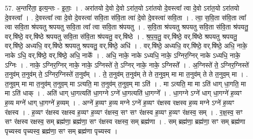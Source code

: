 \documentclass[17pt]{extarticle}
\begin{document}
57. अ॒न्तरि॑ता॒ इत्य॒न्तः - इ॒ताः॒ । . अरा॑तयो दे॒वो दे॒वो ऽरा॑त॒यो ऽरा॑तयो दे॒वस्त्वा᳚ त्वा दे॒वो ऽरा॑त॒यो ऽरा॑तयो दे॒वस्त्वा᳚ । . दे॒वस्त्वा᳚ त्वा दे॒वो दे॒वस्त्वा॑ सवि॒ता स॑वि॒ता त्वा॑ दे॒वो दे॒वस्त्वा॑ सवि॒ता । . त्वा॒ स॒वि॒ता स॑वि॒ता त्वा᳚ त्वा सवि॒ता श्र॑पयतु श्रपयतु सवि॒ता त्वा᳚ त्वा सवि॒ता श्र॑पयतु । . स॒वि॒ता श्र॑पयतु श्रपयतु सवि॒ता स॑वि॒ता श्र॑पयतु॒ वर्.षि॑ष्ठे॒ वर्.षि॑ष्ठे श्रपयतु सवि॒ता स॑वि॒ता श्र॑पयतु॒ वर्.षि॑ष्ठे । . श्र॒प॒य॒तु॒ वर्.षि॑ष्ठे॒ वर्.षि॑ष्ठे श्रपयतु श्रपयतु॒ वर्.षि॑ष्ठे॒ अध्यधि॒ वर्.षि॑ष्ठे श्रपयतु श्रपयतु॒ वर्.षि॑ष्ठे॒ अधि॑ । . वर्.षि॑ष्ठे॒ अध्यधि॒ वर्.षि॑ष्ठे॒ वर्.षि॑ष्ठे॒ अधि॒ नाके॒ नाके ऽधि॒ वर्.षि॑ष्ठे॒ वर्.षि॑ष्ठे॒ अधि॒ नाके᳚ । . अधि॒ नाके॒ नाके ऽध्यधि॒ नाके॒ ऽग्निर॒ग्निर् नाके ऽध्यधि॒ नाके॒ ऽग्निः । . नाके॒ ऽग्निर॒ग्निर् नाके॒ नाके॒ ऽग्निस्ते॑ ते॒ ऽग्निर् नाके॒ नाके॒ ऽग्निस्ते᳚ । . अ॒ग्निस्ते॑ ते॒ ऽग्निर॒ग्निस्ते॑ त॒नुव॑म् त॒नुव॑म् ते॒ ऽग्निर॒ग्निस्ते॑ त॒नुव᳚म् । . ते॒ त॒नुव॑म् त॒नुव॑म् ते ते त॒नुव॒म् मा मा त॒नुव॑म् ते ते त॒नुव॒म् मा । . त॒नुव॒म् मा मा त॒नुव॑म् त॒नुव॒म् मा ऽत्यति॒ मा त॒नुव॑म् त॒नुव॒म् मा ऽति॑ । . मा ऽत्यति॒ मा मा ऽति॑ धाग् धा॒गति॒ मा मा ऽति॑ धाक् । . अति॑ धाग् धा॒गत्यति॑ धा॒गग्ने ऽग्ने॑ धा॒गत्यति॑ धा॒गग्ने᳚ । . धा॒गग्ने ऽग्ने॑ धाग् धा॒गग्ने॑ ह॒व्यꣳ ह॒व्य मग्ने॑ धाग् धा॒गग्ने॑ ह॒व्यम् । . अग्ने॑ ह॒व्यꣳ ह॒व्य मग्ने ऽग्ने॑ ह॒व्यꣳ र॑क्षस्व रक्षस्व ह॒व्य मग्ने ऽग्ने॑ ह॒व्यꣳ र॑क्षस्व । . ह॒व्यꣳ र॑क्षस्व रक्षस्व ह॒व्यꣳ ह॒व्यꣳ र॑क्षस्व॒ सꣳ सꣳ र॑क्षस्व ह॒व्यꣳ ह॒व्यꣳ र॑क्षस्व॒ सम् । . र॒क्ष॒स्व॒ सꣳ सꣳ र॑क्षस्व रक्षस्व॒ सम् ब्रह्म॑णा॒ ब्रह्म॑णा॒ सꣳ र॑क्षस्व रक्षस्व॒ सम् ब्रह्म॑णा । . सम् ब्रह्म॑णा॒ ब्रह्म॑णा॒ सꣳ सम् ब्रह्म॑णा पृच्यस्व पृच्यस्व॒ ब्रह्म॑णा॒ सꣳ सम् ब्रह्म॑णा पृच्यस्व । \newline
\end{document}

